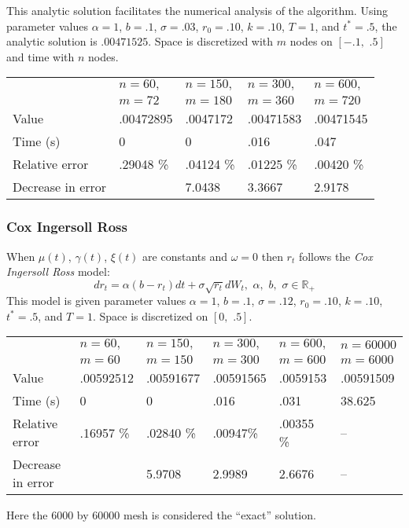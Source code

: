\documentclass[12pt]{article}
\theoremstyle{definition}
\theoremstyle{remark}
\begin{document}
This analytic solution facilitates the numerical analysis of the algorithm.
Using parameter values \(\alpha=1\), \(b=.1\), \(\sigma=.03\), \(r_0=.10\), \(k=.10\),  \(T=1\), and \({t^*}=.5\), the analytic solution is \(.00471525\).  Space is discretized with \(m\) nodes on \([-.1,\,\, .5]\) and time with \(n\) nodes.
\begin{center}
\begin{tabular}{l|l|l|l|l}
& \(n=60,\) & \(n=150,\) &\(n=300,\) & \(n= 600, \)\\
& \( m=72\) & \(m=180\) & \(m=360\) & \(m=720\) \\
\hline
Value & .00472895 & .0047172 & .00471583 & .00471545\\
Time (s) & 0 & 0 &  .016  & .047 \\
Relative error & .29048 \% & .04124 \% & .01225 \%  & .00420 \% \\
Decrease in error &  & 7.0438 & 3.3667 &  2.9178
\end{tabular}
\end{center}
\subsubsection{Cox Ingersoll Ross}

When \(\mu(t)\), \(\gamma(t)\), \(\xi(t)\) are constants and \(\omega=0\) then \(r_t\) follows the \emph{Cox Ingersoll Ross} model:
\[dr_t=\alpha(b-r_t)dt+\sigma \sqrt{r_t}dW_t,\,\,\alpha, \,\,b,\,\, \sigma \in \mathbb{R}_{+}\]
This model is given parameter values \(\alpha=1\), \(b=.1\), \(\sigma=.12\), \(r_0=.10\), \(k=.10\), \({t^*}=.5\), and \(T=1\).  Space is discretized on \([0,\,\, .5]\).
\begin{center}
\begin{tabular}{l|l|l|l|l|l}
& \(n=60,\)& \(n=150,\) &\(n=300,\) & \(n= 600, \) & \(n=60000\) \\
& \( m=60\) & \(m=150\) & \(m=300\) & \(m=600\)&  \(m=6000\) \\
\hline
Value & .00592512 & .00591677 & .00591565 & .0059153  & .00591509\\
Time (s) & 0 & 0 &  .016  & .031  & 38.625\\
Relative error & .16957 \% & .02840 \% & .00947\%  & .00355 \% & --  \\
Decrease in error &  & 5.9708 & 2.9989 &  2.6676 &-- 
\end{tabular}
\end{center}
Here the \(6000\) by \(60000\) mesh is considered the ``exact'' solution. 
\end{document}
